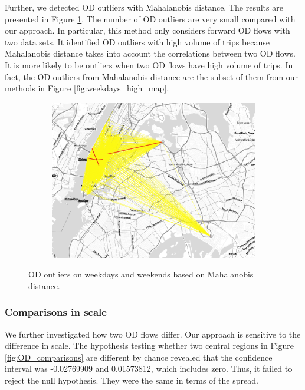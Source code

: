 \documentclass[a4paper,UKenglish]{lipics-v2016}
\begin{document}
Further, we detected OD outliers with Mahalanobis distance. The results are presented in Figure \ref{fig:week_ends_MD}. The number of OD outliers are very small compared with our approach. In particular, this method only considers forward OD flows with two data sets. It identified OD outliers with high volume of trips  because Mahalanobis distance takes into account the correlations between two OD flows. It is more likely to be outliers when two OD flows have high volume of trips. In fact, the OD outliers from Mahalanobis distance are the subset of them from our methods in Figure \ref{fig:weekdays_high_map}. 

\begin{figure}
	\centering
	\begin{subfigure}[b]{0.49\textwidth}
		\includegraphics[width=\textwidth]{images/out_weekdays_weekends_md2_outlier.png}
	\end{subfigure}
	\caption{OD outliers on weekdays and weekends based on Mahalanobis distance. }\label{fig:week_ends_MD}	
\end{figure}

\subsubsection{Comparisons in scale}
We further investigated how two OD flows differ. Our approach is sensitive to the difference in scale. The hypothesis testing whether two central regions in Figure \ref{fig:OD_comparisons} are different by chance revealed that the confidence interval was -0.02769909 and 0.01573812, which includes zero. Thus, it failed to reject the null hypothesis. They were the same in terms of the spread.  
\end{document}
